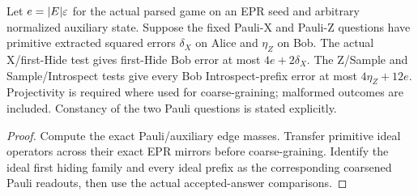 \begin{lemma}
\label{lem:intro-hiding-initialization}
\leanok
Let $e=|E|\varepsilon$ for the actual parsed game on an EPR seed and arbitrary
normalized auxiliary state. Suppose the fixed Pauli-X and Pauli-Z questions
have primitive extracted squared errors $\delta_X$ on Alice and $\eta_Z$ on
Bob. The actual X/first-Hide test gives first-Hide Bob error at most
$4e+2\delta_X$. The Z/Sample and Sample/Introspect tests give every
Bob Introspect-prefix error at most $4\eta_Z+12e$. Projectivity is required
where used for coarse-graining; malformed outcomes are included.
Constancy of the two Pauli questions is stated explicitly.
\end{lemma}
\begin{proof}
\leanok
Compute the exact Pauli/auxiliary edge masses. Transfer primitive ideal
operators across their exact EPR mirrors before coarse-graining. Identify
the ideal first hiding family and every ideal prefix as the corresponding
coarsened Pauli readouts, then use the actual accepted-answer comparisons.
\end{proof}

